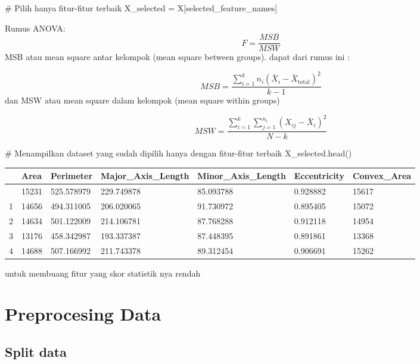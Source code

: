 \documentclass[
  letterpaper,
]{krantz}
\makeatletter
\newenvironment{Shaded}{\begin{snugshade}}{\end{snugshade}}
\newcommand{\CommentTok}[1]{\textcolor[rgb]{0.37,0.37,0.37}{#1}}
\newcommand{\NormalTok}[1]{\textcolor[rgb]{0.00,0.23,0.31}{#1}}
\newcommand{\OperatorTok}[1]{\textcolor[rgb]{0.37,0.37,0.37}{#1}}
\newenvironment{kframe}{%
\medskip{}
\setlength{\fboxsep}{.8em}
 \def\at@end@of@kframe{}%
 \ifinner\ifhmode%
  \def\at@end@of@kframe{\end{minipage}}%
  \begin{minipage}{\columnwidth}%
 \fi\fi%
 \def\FrameCommand##1{\hskip\@totalleftmargin \hskip-\fboxsep
 \colorbox{shadecolor}{##1}\hskip-\fboxsep
     \hskip-\linewidth \hskip-\@totalleftmargin \hskip\columnwidth}%
 \MakeFramed {\advance\hsize-\width
   \@totalleftmargin\z@ \linewidth\hsize
   \@setminipage}}%
 {\par\unskip\endMakeFramed%
 \at@end@of@kframe}
\renewenvironment{Shaded}{\begin{kframe}}{\end{kframe}}
\makeatother
\begin{document}
\begin{Shaded}
\begin{Highlighting}[]
\CommentTok{\# Pilih hanya fitur{-}fitur terbaik}
\NormalTok{X\_selected }\OperatorTok{=}\NormalTok{ X[selected\_feature\_names]}
\end{Highlighting}
\end{Shaded}

Rumus ANOVA: \[
F = \frac{MSB}{MSW}
\] MSB atau mean square antar kelompok (mean square between groups).
dapat dari rumus ini :

\[
MSB = \frac{\sum_{i=1}^{k} n_i (\bar{X}_i - \bar{X}_{\text{total}})^2}{k - 1}
\] dan MSW atau mean square dalam kelompok (mean square within groups)

\[
MSW = \frac{\sum_{i=1}^{k} \sum_{j=1}^{n_i} (X_{ij} - \bar{X}_i)^2}{N - k}
\]

\begin{Shaded}
\begin{Highlighting}[]
\CommentTok{\# Menampilkan dataset yang sudah dipilih hanya dengan fitur{-}fitur terbaik}
\NormalTok{X\_selected.head()}
\end{Highlighting}
\end{Shaded}

\begin{longtable}[]{@{}lllllll@{}}
\toprule\noalign{}
& Area & Perimeter & Major\_Axis\_Length & Minor\_Axis\_Length &
Eccentricity & Convex\_Area \\
\midrule\noalign{}
\endhead
\bottomrule\noalign{}
\endlastfoot
0 & 15231 & 525.578979 & 229.749878 & 85.093788 & 0.928882 & 15617 \\
1 & 14656 & 494.311005 & 206.020065 & 91.730972 & 0.895405 & 15072 \\
2 & 14634 & 501.122009 & 214.106781 & 87.768288 & 0.912118 & 14954 \\
3 & 13176 & 458.342987 & 193.337387 & 87.448395 & 0.891861 & 13368 \\
4 & 14688 & 507.166992 & 211.743378 & 89.312454 & 0.906691 & 15262 \\
\end{longtable}

untuk membuang fitur yang skor statistik nya rendah

\hypertarget{preprocesing-data}{%
\section{Preprocesing Data}\label{preprocesing-data}}

\hypertarget{split-data}{%
\subsection{Split data}\label{split-data}}
\end{document}
